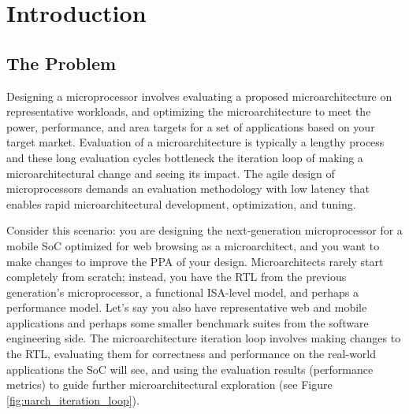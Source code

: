\documentclass[sigplan,nonacm,10pt]{acmart}
\begin{document}
\maketitle

\section{Introduction}


\subsection{The Problem}

Designing a microprocessor involves evaluating a proposed microarchitecture on representative workloads, and optimizing the microarchitecture to meet the power, performance, and area targets for a set of applications based on your target market.
Evaluation of a microarchitecture is typically a lengthy process and these long evaluation cycles bottleneck the iteration loop of making a microarchitectural change and seeing its impact.
The agile design of microprocessors demands an evaluation methodology with low latency that enables rapid microarchitectural development, optimization, and tuning.

Consider this scenario: you are designing the next-generation microprocessor for a mobile SoC optimized for web browsing as a microarchitect, and you want to make changes to improve the PPA of your design.
Microarchitects rarely start completely from scratch; instead, you have the RTL from the previous generation's microprocessor, a functional ISA-level model, and perhaps a performance model.
Let's say you also have representative web and mobile applications and perhaps some smaller benchmark suites from the software engineering side.
The microarchitecture iteration loop involves making changes to the RTL, evaluating them for correctness and performance on the real-world applications the SoC will see, and using the evaluation results (performance metrics) to guide further microarchitectural exploration (see Figure \ref{fig:uarch_iteration_loop}).
\end{document}
